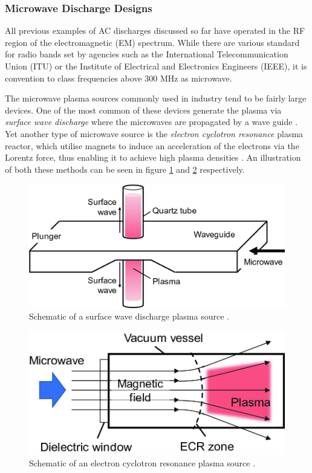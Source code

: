 \subsubsection{Microwave Discharge Designs}
\label{subsec:microwave_discharge}

All previous examples of AC discharges discussed so far have operated in the RF region of the electromagnetic (EM) spectrum. While there are various standard for radio bands set by agencies such as the International Telecommunication Union (ITU) or the Institute of Electrical and Electronics Engineers (IEEE), it is convention to class frequencies above 300 MHz as microwave. 

The microwave plasma sources commonly used in industry tend to be fairly large devices. One of the most common of these devices generate the plasma via \textit{surface wave discharge} where the microwaves are propagated by a wave guide \cite{Toyoda2020}. Yet another type of microwave source is the \textit{electron cyclotron resonance} plasma reactor, which utilise magnets to induce an acceleration of the electrons via the Lorentz force, thus enabling it to achieve high plasma densities \cite{Toyoda2020}. An illustration of both these methods can be seen in figure \ref{fig:surface_wave_discharge} and \ref{fig:electron_cyclotron_resonance} respectively. 

\begin{figure}[h!]
	\centering
	\includegraphics[width=0.55\linewidth]{chapter_2/figures/surface_wave_discharge.png}
	\caption{Schematic of a surface wave discharge plasma source \cite{Toyoda2020}.}
	\label{fig:surface_wave_discharge}
\end{figure} 

\begin{figure}[h!]
	\centering
	\includegraphics[width=0.55\linewidth]{chapter_2/figures/electron_cyclotron_resonance.png}
	\caption{Schematic of an electron cyclotron resonance plasma source \cite{Toyoda2020}.}
	\label{fig:electron_cyclotron_resonance}
\end{figure} 

